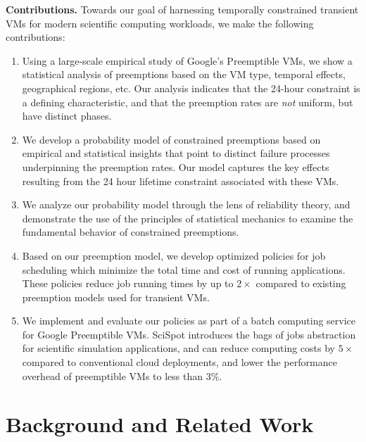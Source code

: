 \documentclass[compsoc]{IEEEtran}
\newcommand{\subsecspace}[0]{-0.20cm}
\begin{document}
\noindent \textbf{Contributions.}
Towards our goal of harnessing temporally constrained transient VMs for modern scientific computing workloads, 
we make the following contributions:
\begin{enumerate} [leftmargin=12pt]
\item Using a large-scale empirical study of Google's Preemptible VMs, we show a statistical analysis of preemptions based on the VM type, temporal effects, geographical regions, etc. Our analysis indicates that the 24-hour constraint is a defining characteristic, and that the preemption rates are \emph{not} uniform, but have distinct phases. 

\item We develop a probability model of constrained preemptions based on empirical and statistical insights that point to distinct failure processes underpinning the preemption rates. Our model captures the key effects resulting from the 24 hour lifetime constraint associated with these VMs.

\item We analyze our probability model through the lens of reliability theory, and demonstrate the use of the principles of statistical mechanics to examine the fundamental behavior of constrained preemptions. 
  


\item Based on our preemption model, we develop optimized policies for job scheduling which minimize the total time and cost of running applications. These policies reduce job running times by up to $2\times$ compared to existing preemption models used for transient VMs. 
  

\item We implement and evaluate our policies as part of a batch computing service for Google Preemptible VMs. SciSpot introduces the bags of jobs abstraction for scientific simulation applications, and can reduce computing costs by $5\times$ compared to conventional cloud deployments, and lower the performance overhead of preemptible VMs to less than $3\%$. 

 
\end{enumerate}



 
\vspace*{\subsecspace}
\section{Background and Related Work}
\end{document}
